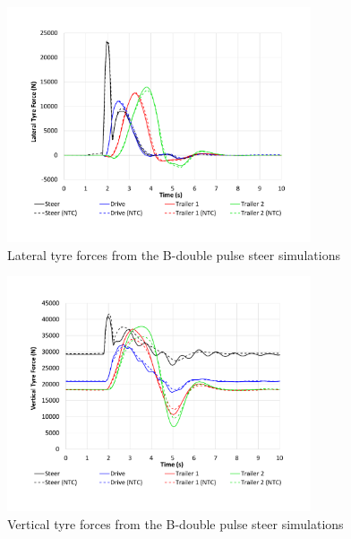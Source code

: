    \begin{figure}[H]
        \centering
        \includegraphics[width=0.8\textwidth]{fig/ntc-b-double_psb}
        \caption{Lateral tyre forces from the B-double pulse steer simulations}
        \label{figure:ntc-b-double_psb}
    \end{figure}
 
    \begin{figure}[H]
        \centering
        \includegraphics[width=0.8\textwidth]{fig/ntc-b-double_psc}
        \caption{Vertical tyre forces from the B-double pulse steer simulations}
        \label{figure:ntc-b-double_psc}
    \end{figure}

